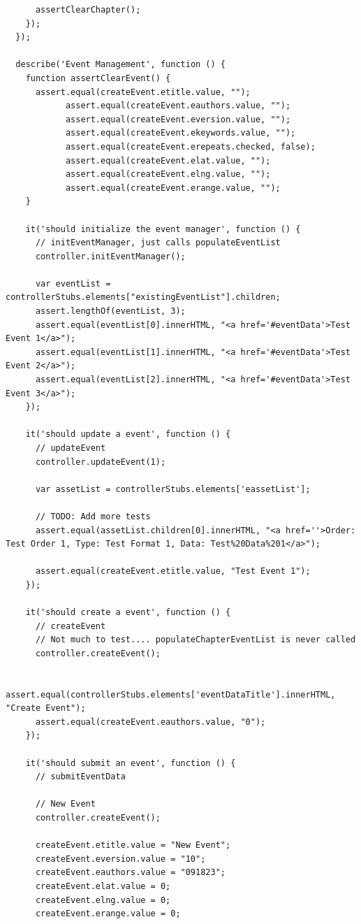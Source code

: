 \documentclass[12pt]{ucthesis}
\begin{document}
\begin{lstlisting}
      assertClearChapter();
    });
  });

  describe('Event Management', function () {
    function assertClearEvent() {
      assert.equal(createEvent.etitle.value, "");
            assert.equal(createEvent.eauthors.value, "");
            assert.equal(createEvent.eversion.value, "");
            assert.equal(createEvent.ekeywords.value, "");
            assert.equal(createEvent.erepeats.checked, false);
            assert.equal(createEvent.elat.value, "");
            assert.equal(createEvent.elng.value, "");
            assert.equal(createEvent.erange.value, "");
    }

    it('should initialize the event manager', function () {
      // initEventManager, just calls populateEventList
      controller.initEventManager();

      var eventList = controllerStubs.elements["existingEventList"].children;
      assert.lengthOf(eventList, 3);
      assert.equal(eventList[0].innerHTML, "<a href='#eventData'>Test Event 1</a>");
      assert.equal(eventList[1].innerHTML, "<a href='#eventData'>Test Event 2</a>");
      assert.equal(eventList[2].innerHTML, "<a href='#eventData'>Test Event 3</a>");
    });

    it('should update a event', function () {
      // updateEvent
      controller.updateEvent(1);

      var assetList = controllerStubs.elements['eassetList'];

      // TODO: Add more tests
      assert.equal(assetList.children[0].innerHTML, "<a href=''>Order: Test Order 1, Type: Test Format 1, Data: Test%20Data%201</a>");

      assert.equal(createEvent.etitle.value, "Test Event 1");
    });

    it('should create a event', function () {
      // createEvent
      // Not much to test.... populateChapterEventList is never called
      controller.createEvent();
      
      assert.equal(controllerStubs.elements['eventDataTitle'].innerHTML, "Create Event");
      assert.equal(createEvent.eauthors.value, "0");  
    });

    it('should submit an event', function () {
      // submitEventData

      // New Event
      controller.createEvent();

      createEvent.etitle.value = "New Event";
      createEvent.eversion.value = "10";
      createEvent.eauthors.value = "091823";
      createEvent.elat.value = 0;
      createEvent.elng.value = 0;
      createEvent.erange.value = 0;


\end{lstlisting}
\end{document}
